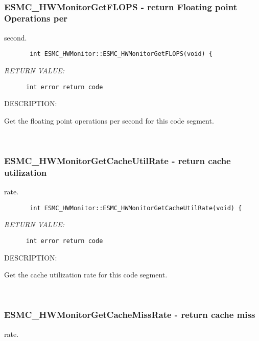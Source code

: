  
\mbox{}\hrulefill\ 
 
\subsubsection{ESMC\_HWMonitorGetFLOPS - return Floating point Operations per }


   second.
  
\begin{verbatim}       int ESMC_HWMonitor::ESMC_HWMonitorGetFLOPS(void) {\end{verbatim}{\em RETURN VALUE:}
\begin{verbatim}      int error return code\end{verbatim}
{\sf DESCRIPTION:\\ }


        Get the floating point operations per second for this code segment.
   
 
\mbox{}\hrulefill\ 
 
\subsubsection{ESMC\_HWMonitorGetCacheUtilRate - return cache utilization}


   rate.
  
\begin{verbatim}       int ESMC_HWMonitor::ESMC_HWMonitorGetCacheUtilRate(void) {\end{verbatim}{\em RETURN VALUE:}
\begin{verbatim}      int error return code\end{verbatim}
{\sf DESCRIPTION:\\ }


        Get the cache utilization rate for this code segment.
   
 
\mbox{}\hrulefill\ 
 
\subsubsection{ESMC\_HWMonitorGetCacheMissRate - return cache miss}


   rate.
  
